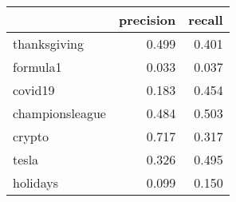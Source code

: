 \begin{tabular}{lrr}
\toprule
{} &  precision &  recall \\
\midrule
thanksgiving    &      0.499 &   0.401 \\
formula1        &      0.033 &   0.037 \\
covid19         &      0.183 &   0.454 \\
championsleague &      0.484 &   0.503 \\
crypto          &      0.717 &   0.317 \\
tesla           &      0.326 &   0.495 \\
holidays        &      0.099 &   0.150 \\
\bottomrule
\end{tabular}
